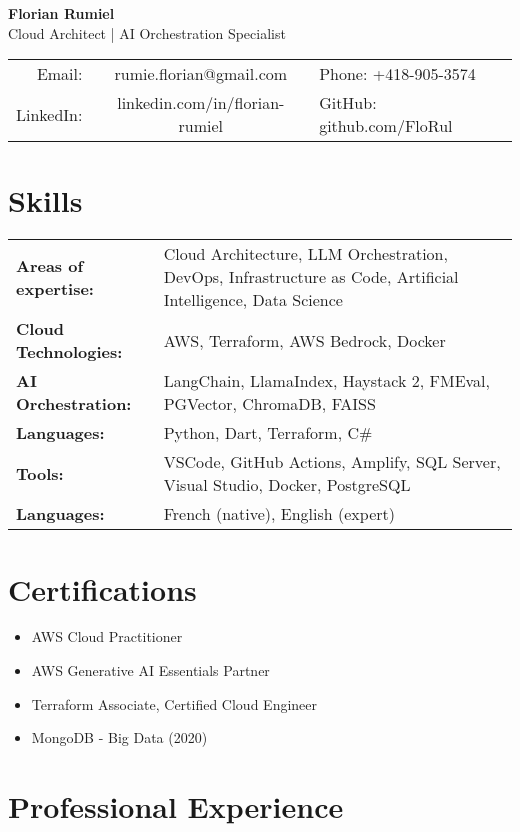 ﻿\documentclass[11pt,letterpaper]{article}
\begin{document}
\begin{center}
  {\LARGE\textbf{Florian Rumiel}} \\[0.3em]
  {\large Cloud Architect | AI Orchestration Specialist} \\[0.5em]
  \begin{tabular}{r c l}
    Email: & rumie.florian@gmail.com & Phone: +418-905-3574 \\
    LinkedIn: & linkedin.com/in/florian-rumiel & GitHub: github.com/FloRul \\
  \end{tabular}
\end{center}

\section*{Skills}
\begin{tabularx}{\textwidth}{@{}l X@{}}
\textbf{Areas of expertise:} & Cloud Architecture, LLM Orchestration, DevOps, Infrastructure as Code, Artificial Intelligence, Data Science \\
\textbf{Cloud Technologies:} & AWS, Terraform, AWS Bedrock, Docker \\
\textbf{AI Orchestration:} & LangChain, LlamaIndex, Haystack 2, FMEval, PGVector, ChromaDB, FAISS \\
\textbf{Languages:} & Python, Dart, Terraform, C\# \\
\textbf{Tools:} & VSCode, GitHub Actions, Amplify, SQL Server, Visual Studio, Docker, PostgreSQL \\
\textbf{Languages:} & French (native), English (expert) \\
\end{tabularx}

\section*{Certifications}
\begin{itemize}
  \item AWS Cloud Practitioner
  \item AWS Generative AI Essentials Partner
  \item Terraform Associate, Certified Cloud Engineer
  \item MongoDB - Big Data (2020)
\end{itemize}

\section*{Professional Experience}
\end{document}
